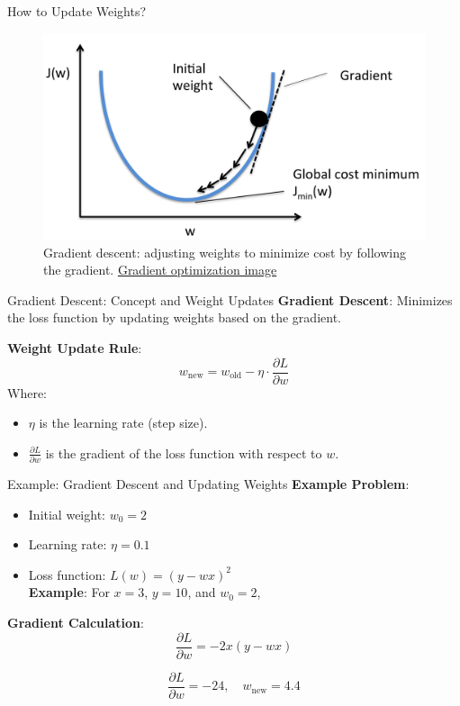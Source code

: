 \documentclass[serif, aspectratio=169]{beamer}
\begin{document}
\begin{frame}{How to Update Weights?}

    \begin{center}
            \begin{figure}
            \centering
            \includegraphics[height=.6\textheight]{pic/ball.png}
            \\
{Gradient descent: adjusting weights to minimize cost by following the gradient.} \href{https://sebastianraschka.com/images/faq/gradient-optimization/ball.png}{Gradient optimization image}
        \end{figure}
    \end{center}
\end{frame}


\begin{frame}{Gradient Descent: Concept and Weight Updates}
    \textbf{Gradient Descent}: Minimizes the loss function by updating weights based on the gradient.

    \textbf{Weight Update Rule}:
    \[
    w_{\text{new}} = w_{\text{old}} - \eta \cdot \frac{\partial L}{\partial w}
    \]
    Where:
    \begin{itemize}
        \item \( \eta \) is the learning rate (step size).
        \item \( \frac{\partial L}{\partial w} \) is the gradient of the loss function with respect to \( w \).
    \end{itemize}
\end{frame}

\begin{frame}{Example: Gradient Descent and Updating Weights}
    \textbf{Example Problem}:
    \begin{itemize}
        \item Initial weight: \( w_0 = 2 \)
        \item Learning rate: \( \eta = 0.1 \)
        \item Loss function: \( L(w) = (y - wx)^2 \) \\
        \textbf{Example}: For \( x = 3 \), \( y = 10 \), and \( w_0 = 2 \),

    \end{itemize}
    
    \textbf{Gradient Calculation}:
    \[
    \frac{\partial L}{\partial w} = -2x(y - wx)
    \]
    
    \[
    \frac{\partial L}{\partial w} = -24, \quad w_{\text{new}} = 4.4
    \]
\end{frame}
\end{document}
